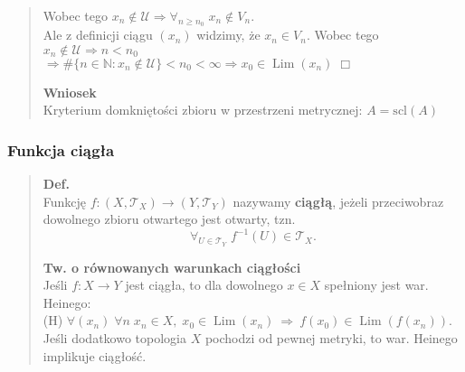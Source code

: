 \documentclass[10pt,a4paper]{article}
\begin{document}
{\begin{quote}
\begin{tcolorbox}[mybox]
    Wobec tego $x_n \notin \mathcal{U} \Rightarrow \forall_{n \ge n_0}\; x_n \notin V_n$.\\
    Ale z definicji ciągu $(x_n)$ widzimy, że $x_n \in V_n$. Wobec tego $x_n \notin \mathcal{U} \Rightarrow n < n_0$\\
    $\Rightarrow \# \{n \in \mathbb{N} : x_n \notin \mathcal{U}\} < n_0 < \infty \Rightarrow x_0 \in \operatorname{Lim}(x_n) \;\Box$
    \end{tcolorbox}
    \textbf{Wniosek}\\
    Kryterium domkniętości zbioru w przestrzeni metrycznej: $A = \mathrm{scl}(A)$
    \end{quote}


    \subsubsection*{Funkcja ciągła}
    \begin{quote}
    \textbf{Def.}\\
    Funkcję $f : (X, \mathcal{T}_X) \to (Y, \mathcal{T}_Y)$ nazywamy \textbf{ciągłą}, jeżeli przeciwobraz dowolnego zbioru otwartego jest otwarty, tzn. \\
    $$\forall_{U \in \mathcal{T}_Y} \; f^{-1}(U) \in \mathcal{T}_X.$$
  
    \textbf{Tw. o równowanych warunkach ciągłości}\\
    Jeśli $f: X \to Y$ jest ciągła, to dla dowolnego $x \in X$ spełniony jest war. Heinego:\\
    (H)\; $\forall (x_n)\; \forall n\; x_n\in X,\; x_0\in \operatorname{Lim}(x_n)\ \Rightarrow\ f(x_0)\in \operatorname{Lim}(f(x_n))$.\\
    Jeśli dodatkowo topologia $X$ pochodzi od pewnej metryki, to war. Heinego implikuje ciągłość.\\


\end{quote}}
\end{document}
